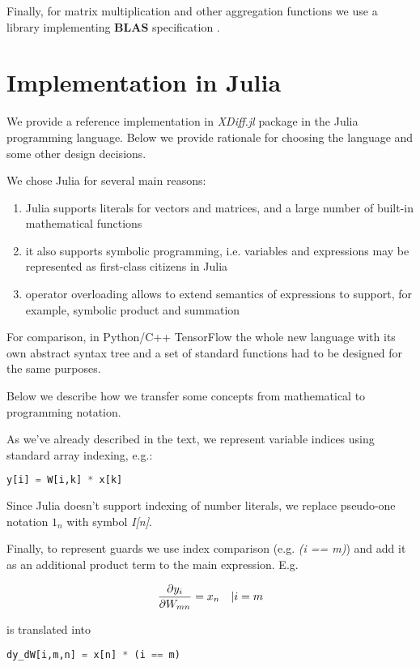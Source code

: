 \documentclass[conference]{IEEEtran}
\begin{document}
Finally, for matrix multiplication and other aggregation functions we
use a library implementing \textbf{BLAS} specification \cite{BLAS}.


\section{Implementation in Julia}

We provide a reference implementation in \textit{XDiff.jl}
\cite{XDiff} package in the Julia programming language. Below we
provide rationale for choosing the language and some other design
decisions.

We chose Julia for several main reasons:

\begin{enumerate}
\item Julia supports literals for vectors and matrices, and a large
  number of built-in mathematical functions
\item it also supports symbolic programming, i.e. variables and
  expressions may be represented as first-class citizens in Julia
\item operator overloading allows to extend semantics of expressions
  to support, for example, symbolic product and summation
\end{enumerate}

For comparison, in Python/C++ TensorFlow the whole new language with
its own abstract syntax tree and a set of standard functions had to be
designed for the same purposes.

Below we describe how we transfer some concepts from mathematical to
programming notation.

As we've already described in the text, we represent variable indices
using standard array indexing, e.g.:

\begin{lstlisting}[language=Python]
  y[i] = W[i,k] * x[k]
\end{lstlisting}

Since Julia doesn't support indexing of number literals, we replace
pseudo-one notation $1_n$ with symbol \textit{I[n]}.

Finally, to represent guards we use index comparison (e.g. \textit{(i
  == m)}) and add it as an additional product term to the main
expression. E.g.

$$\pdv{y_i}{W_{mn}} = x_n \quad | i = m$$

is translated into

\begin{lstlisting}[language=Python]
  dy_dW[i,m,n] = x[n] * (i == m)
\end{lstlisting}
\end{document}
